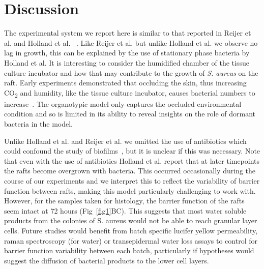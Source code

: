 \documentclass[10pt,letterpaper]{article}
\begin{document}
\section*{Discussion}

The experimental system we report here is similar to that reported in Reijer et al. and Holland et al. ~\cite{reijer_detection_2016,holland_microbial_2008}.
Like Reijer et al. but unlike Holland et al. we observe no lag in growth, this can be explained by the use of stationary phase bacteria by Holland et al.
It is interesting to consider the humidified chamber of the tissue culture incubator and how that may contribute to the growth of \textit{S. aureus} on the raft.
Early experiments demonstrated that occluding the skin, thus increasing CO\textsubscript{2} and humidity, like the tissue culture incubator, causes bacterial numbers to increase~\cite{lovell_skin_1945-1}.
The organotypic model only captures the occluded environmental condition and so is limited in its ability to reveal insights on the role of dormant bacteria in the model.

Unlike Holland et al. and Reijer et al. we omitted the use of antibiotics which could confound the study of biofilms~\cite{kaplan_low_2012}, but it is unclear if this was necessary.
Note that even with the use of antibiotics Holland et al. report that at later timepoints the rafts become overgrown with bacteria.
This occurred occasionally during the course of our experiments and we interpret this to reflect the variability of barrier function between rafts, making this model particularly challenging to work with.
However, for the samples taken for histology, the barrier function of the rafts seem intact at 72 hours (Fig~\ref{fig1}BC).
This suggests that most water soluble products from the colonies of S. aureus would not be able to reach granular layer cells.
Future studies would benefit from batch specific lucifer yellow permeability, raman spectroscopy (for water) or transepidermal water loss assays to control for barrier function variability between each batch, particularly if hypotheses would suggest the diffusion of bacterial products to the lower cell layers.
\end{document}
